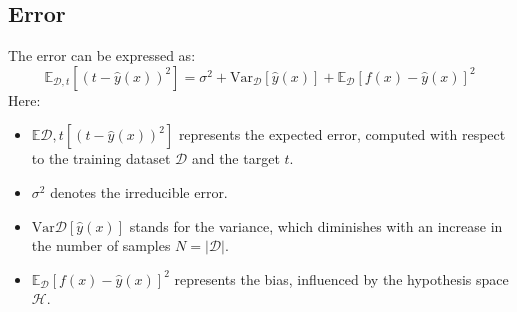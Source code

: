 \subsection{Error}
The error can be expressed as:
\[\mathbb{E}_{\mathcal{D},t}\left[{\left(t-\hat{y}(x)\right)}^2\right]=\sigma^2+\text{Var}_{\mathcal{D}}\left[\hat{y}(x)\right]+\mathbb{E}_{\mathcal{D}}{\left[f(x)-\hat{y}(x)\right]}^2\]
Here: 
\begin{itemize}
    \item $\mathbb{E}{\mathcal{D},t}\left[{\left(t-\hat{y}(x)\right)}^2\right]$ represents the expected error, computed with respect to the training dataset $\mathcal{D}$ and the target $t$.
    \item $\sigma^2$ denotes the irreducible error.
    \item $\text{Var}{\mathcal{D}}\left[\hat{y}(x)\right]$ stands for the variance, which diminishes with an increase in the number of samples $N=\left\lvert \mathcal{D}\right\rvert$.
    \item $\mathbb{E}_{\mathcal{D}}{\left[f(x)-\hat{y}(x)\right]}^2$ represents the bias, influenced by the hypothesis space $\mathcal{H}$.
\end{itemize}